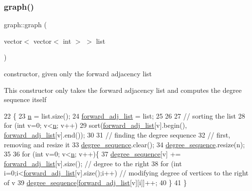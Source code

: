 \subsubsection{\texorpdfstring{graph()}{graph()}\hspace{0.1cm}{\footnotesize\ttfamily [3/3]}}
{\footnotesize\ttfamily graph\+::graph (\begin{DoxyParamCaption}\item[{vector$<$ vector$<$ int $>$ $>$}]{list }\end{DoxyParamCaption})}



constructor, given only the forward adjacency list 

This constructor only takes the forward adjacency list and computes the degree sequence itself 
\begin{DoxyCode}
22 \{
23   \hyperlink{classgraph_ac8b3474ce95c04087c312508ec1443b6}{n} = list.size();
24   \hyperlink{classgraph_a7d6441850d586d6a99fb73df57b70362}{forward\_adj\_list} = list;
25 
26 
27   \textcolor{comment}{// sorting the list}
28   \textcolor{keywordflow}{for} (\textcolor{keywordtype}{int} v=0; v<\hyperlink{classgraph_ac8b3474ce95c04087c312508ec1443b6}{n}; v++)
29     sort(\hyperlink{classgraph_a7d6441850d586d6a99fb73df57b70362}{forward\_adj\_list}[v].begin(), \hyperlink{classgraph_a7d6441850d586d6a99fb73df57b70362}{forward\_adj\_list}[v].end());
30 
31   \textcolor{comment}{// finding the degree sequence}
32   \textcolor{comment}{// first, removing and resize it}
33   \hyperlink{classgraph_a0b31295672bfe37669c9eb3640977fe6}{degree\_sequence}.clear();
34   \hyperlink{classgraph_a0b31295672bfe37669c9eb3640977fe6}{degree\_sequence}.resize(n);
35 
36   \textcolor{keywordflow}{for} (\textcolor{keywordtype}{int} v=0; v<\hyperlink{classgraph_ac8b3474ce95c04087c312508ec1443b6}{n}; v++)\{
37     \hyperlink{classgraph_a0b31295672bfe37669c9eb3640977fe6}{degree\_sequence}[v] += \hyperlink{classgraph_a7d6441850d586d6a99fb73df57b70362}{forward\_adj\_list}[v].size(); \textcolor{comment}{// degree to the right
       }
38     \textcolor{keywordflow}{for} (\textcolor{keywordtype}{int} i=0;i<\hyperlink{classgraph_a7d6441850d586d6a99fb73df57b70362}{forward\_adj\_list}[v].size();i++) \textcolor{comment}{// modifying degree of vertices to the
       right of v}
39       \hyperlink{classgraph_a0b31295672bfe37669c9eb3640977fe6}{degree\_sequence}[\hyperlink{classgraph_a7d6441850d586d6a99fb73df57b70362}{forward\_adj\_list}[v][i]]++;
40   \}
41 \}
\end{DoxyCode}


